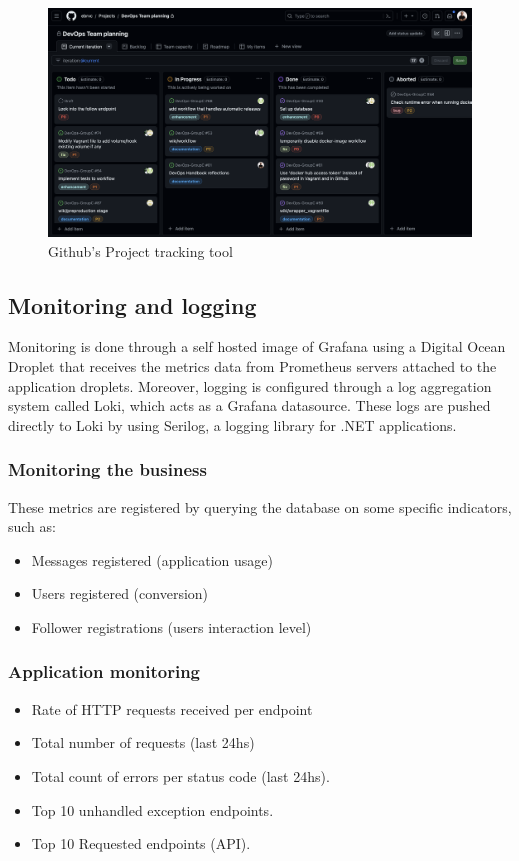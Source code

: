 \begin{figure}[H]
    \centering
    \includegraphics[width=\textwidth]{images/github-project-tracking.png}
    \caption{Github's Project tracking tool}
    \label{fig:github-project-feature}
\end{figure}

\subsection{Monitoring and logging}
Monitoring is done through a self hosted image of Grafana using a Digital Ocean Droplet that receives the metrics data from Prometheus servers attached to the application droplets. Moreover, logging is configured through a log aggregation system called Loki, which acts as a Grafana datasource. These logs are pushed directly to Loki by using Serilog, a logging library for .NET applications.

\subsubsection{Monitoring the business}
These metrics are registered by querying the database on some specific indicators, such as:
\begin{itemize}
    \item Messages registered (application usage)
    \item Users registered (conversion)
    \item Follower registrations (users interaction level)
\end{itemize}

\subsubsection{Application monitoring}
\begin{itemize}
    \item Rate of HTTP requests received per endpoint
    \item Total number of requests (last 24hs)
    \item Total count of errors per status code (last 24hs).
    \item Top 10 unhandled exception endpoints.
    \item Top 10 Requested endpoints (API).
\end{itemize}

